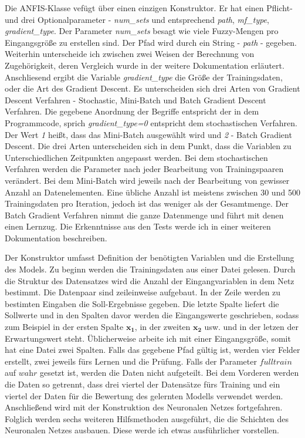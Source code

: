 Die ANFIS-Klasse vefügt über einen einzigen Konstruktor. Er hat einen Pflicht- und drei Optionalparameter - \emph{num\_sets} und entsprechend \emph{path}, \emph{mf\_type}, \emph{gradient\_type}. Der Parameter \emph{num\_sets} besagt wie viele Fuzzy-Mengen pro Eingangsgröße zu erstellen sind. Der Pfad wird durch ein String - \emph{path} - gegeben. Weiterhin unterscheide ich zwischen zwei Weisen der Berechnung von Zugehörigkeit, deren Vergleich wurde in der weitere Dokumentation erläutert. Anschliesend ergibt die Variable \emph{gradient\_type} die Größe der Trainingsdaten, oder die Art des Gradient Descent. Es unterscheiden sich drei Arten von Gradient Descent Verfahren -
Stochastic, Mini-Batch und Batch Gradient Descent Verfahren. Die gegebene Anordnung der Begriffe entspricht der in dem Programmcode, sprich \emph{gradient\_type=0} entspricht dem stochastischen Verfahren. Der Wert \emph{1} heißt, dass das Mini-Batch ausgewählt wird und \emph{2} - Batch Gradient Descent. Die drei Arten unterscheiden sich in dem Punkt, dass die Variablen zu Unterschiedlichen Zeitpunkten angepasst werden. Bei dem stochastischen Verfahren werden die Parameter nach jeder Bearbeitung von Trainingspaaren verändert. Bei dem Mini-Batch wird jeweils nach der Bearbeitung von gewisser Anzahl an Datenelementen. Eine übliche Anzahl ist meistens zwischen 30 und 500 Trainingsdaten pro Iteration, jedoch ist das weniger als der Gesamtmenge. Der Batch Gradient Verfahren nimmt die ganze Datenmenge und führt mit denen einen Lernzug. Die Erkenntnisse aus den Tests werde ich in einer weiteren Dokumentation beschreiben.

Der Konstruktor umfasst Definition der benötigten Variablen und die Erstellung des Models. Zu beginn werden die Trainingsdaten aus einer Datei gelesen. Durch die Struktur des Datensatzes wird die Anzahl der Eingangvariablen in dem Netz bestimmt. Die Datenpaar sind zeileinweise aufgebaut. In der Zeile werden zu bestimten Eingaben die Soll-Ergebnisse gegeben. Die letzte Spalte liefert die Sollwerte und in den Spalten davor werden die Eingangswerte geschrieben, sodass zum Beispiel in der ersten Spalte \(\mathbf{x_1}\), in der zweiten \(\mathbf{x_2}\) usw. und in der letzen der Erwartungswert steht. Üblicherweise arbeite ich mit einer Eingangsgröße, somit hat eine Datei zwei Spalten. 
Falls das gegebene Pfad gültig ist, werden vier Felder erstellt, zwei jeweils fürs Lernen und die Prüfung. Falls der Parameter \(\textit{fulltrain}\) auf \(\textit{wahr}\) gesetzt ist, werden die Daten nicht aufgeteilt. Bei dem Vorderen werden die Daten so getrennt, dass drei viertel der Datensätze fürs Training und ein viertel der Daten für die Bewertung des gelernten Modells verwendet werden. 
Anschließend wird mit der Konstruktion des Neuronalen Netzes fortgefahren. Folglich werden sechs weiteren Hilfsmethoden ausgeführt, die die Schichten des Neuronalen Netzes ausbauen. Diese werde ich etwas ausführlicher vorstellen.

